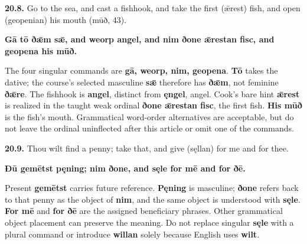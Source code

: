 \par\begin{minipage}{\linewidth}\raggedright
\textbf{20.8.} Go to the sea, and cast a fishhook, and take the first (ǣrest) fish, and open (geopenian) his mouth (mūð, 43).

\textbf{Gā tō ðǣm sǣ, and weorp angel, and nim ðone ǣrestan fisc, and geopena his mūð.}

The four singular commands are \textbf{gā, weorp, nim, geopena}. \textbf{Tō} takes the dative; the course's selected masculine \textbf{sǣ} therefore has \textbf{ðǣm}, not feminine \textbf{ðǣre}. The fishhook is \textbf{angel}, distinct from \textbf{ęngel}, angel. Cook's bare hint \textbf{ǣrest} is realized in the taught weak ordinal \textbf{ðone ǣrestan fisc}, the first fish. \textbf{His mūð} is the fish's mouth. Grammatical word-order alternatives are acceptable, but do not leave the ordinal uninflected after this article or omit one of the commands.

\end{minipage}\par\addvspace{4pt}

\par\begin{minipage}{\linewidth}\raggedright
\textbf{20.9.} Thou wilt find a penny; take that, and give (sęllan) for me and for thee.

\textbf{Ðū gemētst pęning; nim ðone, and sęle for mē and for ðē.}

Present \textbf{gemētst} carries future reference. \textbf{Pęning} is masculine; \textbf{ðone} refers back to that penny as the object of \textbf{nim}, and the same object is understood with \textbf{sęle}. \textbf{For mē} and \textbf{for ðē} are the assigned beneficiary phrases. Other grammatical object placement can preserve the meaning. Do not replace singular \textbf{sęle} with a plural command or introduce \textbf{willan} solely because English uses \textbf{wilt}.

\end{minipage}\par\addvspace{4pt}

